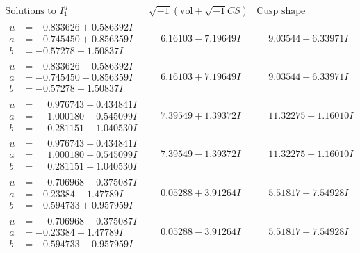 \documentclass[1p]{elsarticle_modified}
\theoremstyle{definition}
\newcommand{\I}{\sqrt{-1}}
\begin{document}
$$\begin{array}{c|c|c}  
\text{Solutions to }I^u_{1}& \I (\text{vol} + \sqrt{-1}CS) & \text{Cusp shape}\\
 \hline 
\begin{aligned}
u &= -0.833626 + 0.586392 I \\
a &= -0.745450 + 0.856359 I \\
b &= -0.57278 - 1.50837 I\end{aligned}
 & \phantom{-}6.16103 - 7.19649 I & \phantom{-}9.03544 + 6.33971 I \\ \hline\begin{aligned}
u &= -0.833626 - 0.586392 I \\
a &= -0.745450 - 0.856359 I \\
b &= -0.57278 + 1.50837 I\end{aligned}
 & \phantom{-}6.16103 + 7.19649 I & \phantom{-}9.03544 - 6.33971 I \\ \hline\begin{aligned}
u &= \phantom{-}0.976743 + 0.434841 I \\
a &= \phantom{-}1.000180 + 0.545099 I \\
b &= \phantom{-}0.281151 - 1.040530 I\end{aligned}
 & \phantom{-}7.39549 + 1.39372 I & \phantom{-}11.32275 - 1.16010 I \\ \hline\begin{aligned}
u &= \phantom{-}0.976743 - 0.434841 I \\
a &= \phantom{-}1.000180 - 0.545099 I \\
b &= \phantom{-}0.281151 + 1.040530 I\end{aligned}
 & \phantom{-}7.39549 - 1.39372 I & \phantom{-}11.32275 + 1.16010 I \\ \hline\begin{aligned}
u &= \phantom{-}0.706968 + 0.375087 I \\
a &= -0.23384 - 1.47789 I \\
b &= -0.594733 + 0.957959 I\end{aligned}
 & \phantom{-}0.05288 + 3.91264 I & \phantom{-}5.51817 - 7.54928 I \\ \hline\begin{aligned}
u &= \phantom{-}0.706968 - 0.375087 I \\
a &= -0.23384 + 1.47789 I \\
b &= -0.594733 - 0.957959 I\end{aligned}
 & \phantom{-}0.05288 - 3.91264 I & \phantom{-}5.51817 + 7.54928 I \\ \hline\begin{aligned}

\end{aligned}
\end{array}$$
\end{document}
